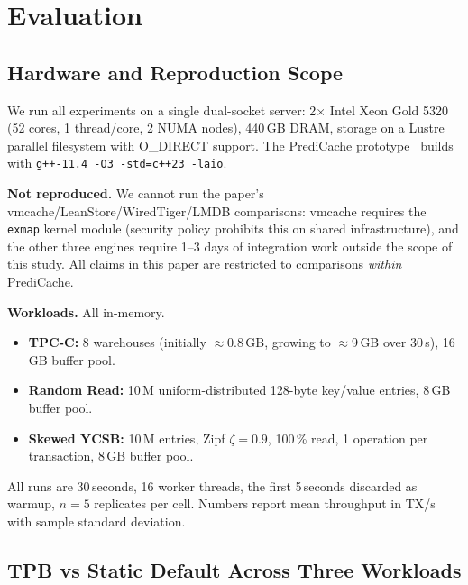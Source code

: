 \documentclass[10pt,twocolumn]{article}
\begin{document}
\section{Evaluation}

\subsection{Hardware and Reproduction Scope}

We run all experiments on a single dual-socket server: 2$\times$ Intel
Xeon Gold 5320 (52 cores, 1 thread/core, 2 NUMA nodes),
440\,GB DRAM, storage on a Lustre parallel filesystem with O\_DIRECT
support.  The PrediCache prototype~\cite{zinsmeister2026predictive_repo}
builds with \texttt{g++-11.4 -O3 -std=c++23 -laio}.

\textbf{Not reproduced.}  We cannot run the paper's
vmcache/LeanStore/WiredTiger/LMDB comparisons: vmcache requires the
\texttt{exmap} kernel module (security policy prohibits this on shared
infrastructure), and the other three engines require 1--3 days of
integration work outside the scope of this study.  All claims in this
paper are restricted to comparisons \emph{within} PrediCache.

\textbf{Workloads.}  All in-memory.

\begin{itemize}\itemsep0pt
\item \textbf{TPC-C:} 8 warehouses (initially $\approx 0.8$\,GB,
  growing to $\approx 9$\,GB over 30\,s), 16\,GB buffer pool.
\item \textbf{Random Read:} 10\,M uniform-distributed 128-byte
  key/value entries, 8\,GB buffer pool.
\item \textbf{Skewed YCSB:} 10\,M entries, Zipf $\zeta\!=\!0.9$,
  100\,\% read, 1 operation per transaction, 8\,GB buffer pool.
\end{itemize}

All runs are 30\,seconds, 16 worker threads, the first 5\,seconds
discarded as warmup, $n\!=\!5$ replicates per cell.  Numbers report
mean throughput in TX/s with sample standard deviation.

\subsection{TPB vs Static Default Across Three Workloads}
\end{document}
